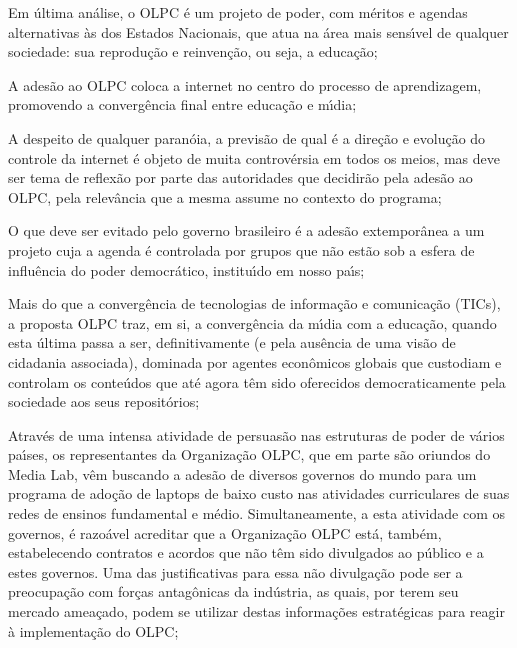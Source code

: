 \documentclass[
12pt,		%
openright,	%
twoside,  %
a4paper,			%
chapter=TITLE,		%
english,			%
french,				%
spanish,			%
brazil				%
]{USPSC-classe/USPSC}
\begin{document}
\begin{alineas}
\item \textquotedbl Em \'ultima an\'alise, o OLPC \'e um projeto de poder, com m\'eritos e agendas alternativas \`as dos Estados Nacionais, que atua na \'area mais sens\'{\i}vel de qualquer sociedade: sua reprodu\c{c}\~ao e reinven\c{c}\~ao, ou seja, a educa\c{c}\~ao;\textquotedbl 
\item \textquotedbl A ades\~ao ao OLPC coloca a internet no centro do processo de aprendizagem, promovendo a converg\^encia final entre educa\c{c}\~ao e m\'{\i}dia; \textquotedbl 
\item \textquotedbl A despeito de qualquer paran\'oia, a previs\~ao de qual \'e a dire\c{c}\~ao e evolu\c{c}\~ao do controle da internet \'e objeto de muita controv\'ersia em todos os meios, mas deve ser tema de reflex\~ao por parte das autoridades que decidir\~ao pela ades\~ao ao OLPC, pela relev\^ancia que a mesma assume no contexto do programa;\textquotedbl 
\item \textquotedbl O que deve ser evitado pelo governo brasileiro \'e a ades\~ao extempor\^anea a um projeto cuja a agenda \'e controlada por grupos que n\~ao est\~ao sob a esfera de influ\^encia do poder democr\'atico, institu\'{\i}do em nosso pa\'{\i}s;\textquotedbl 
\item \textquotedbl Mais do que a converg\^encia de tecnologias de informa\c{c}\~ao e comunica\c{c}\~ao (TICs), a proposta OLPC traz, em si, a converg\^encia da m\'{\i}dia com a educa\c{c}\~ao, quando esta \'ultima passa a ser, definitivamente (e pela aus\^encia de uma vis\~ao de cidadania associada), dominada por agentes econ\^omicos globais que custodiam e controlam os conte\'udos que at\'e agora t\^em sido oferecidos democraticamente pela sociedade aos seus reposit\'orios;\textquotedbl 
\item \textquotedbl Atrav\'es de uma intensa atividade de persuas\~ao nas estruturas de poder de v\'arios pa\'{\i}ses, os representantes da Organiza\c{c}\~ao OLPC, que em parte s\~ao oriundos do Media Lab, v\^em buscando a ades\~ao de diversos governos do mundo para um programa de ado\c{c}\~ao de laptops de baixo custo nas atividades curriculares de suas redes de ensinos fundamental e m\'edio. Simultaneamente, a esta atividade com os governos, \'e razo\'avel acreditar que a Organiza\c{c}\~ao OLPC est\'a, tamb\'em, estabelecendo contratos e acordos que n\~ao t\^em sido divulgados ao p\'ublico e a estes governos. Uma das justificativas para essa n\~ao divulga\c{c}\~ao pode ser a preocupa\c{c}\~ao com for\c{c}as antag\^onicas da ind\'ustria, as quais, por terem seu mercado amea\c{c}ado, podem se utilizar destas informa\c{c}\~oes estrat\'egicas para reagir \`a implementa\c{c}\~ao do OLPC;\textquotedbl 

\end{alineas}
\end{document}
